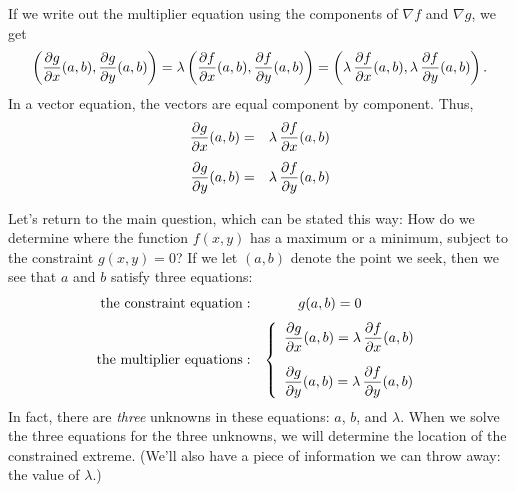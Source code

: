 {{{{        If we write out the multiplier equation using the components of $\nabla f$ and $\nabla g$, we get
        \[
\left({\partial g \over \partial x}(a, b), 
                {\partial g \over \partial y}(a, b) \right) =
                \lambda \left({\partial f \over \partial x}(a, b), 
                {\partial f \over \partial y}(a, b) \right) = 
                \left(\lambda \, {\partial f \over \partial x}(a, b), 
                \lambda \, {\partial f \over \partial y}(a, b) \right).
\]
In a vector equation, the vectors are equal component by component.  Thus,
        \begin{eqnarray*}
        {\partial g \over \partial x}(a, b) &=& 
                \lambda \, {\partial f \over \partial x}(a, b) \\[4pt]
        {\partial g \over \partial y}(a, b) &=& 
                \lambda \, {\partial f \over \partial y}(a, b) 
        \end{eqnarray*}
        
        
        Let's return to the main question, 
which can be stated this way: How do we determine where the function $f(x, y)$ has a maximum or a minimum, subject to the constraint $g(x, y) = 0$?  If we let $(a, b)$ denote the point we seek, then we see that $a$ and $b$ satisfy three equations:
        \[
\begin{array}{rl}
        \mbox{the constraint equation}: & \hspace{24pt} g(a, b) = 0     \\[7pt]
        \mbox{the multiplier equations}: &
                \left\{
                \begin{array}{l}
                {\displaystyle{\partial g \over \partial x}(a, b)} = 
                        \lambda \, 
                {\displaystyle{\partial f \over \partial x}(a, b)} \\[14pt]
                {\displaystyle{\partial g \over \partial y}(a, b)} = 
                        \lambda \, 
                        {\displaystyle{\partial f \over \partial y}(a, b)}
                 \end{array}
                 \right.
        \end{array}
\]
In fact, there are {\em three\/} unknowns in these equations: $a$, $b$, and $\lambda$.  When we solve the three equations for the three unknowns, we will determine the location of the constrained extreme.  (We'll also have a piece of information we can throw away: the value of $\lambda$.)
\medskip




}}}}
